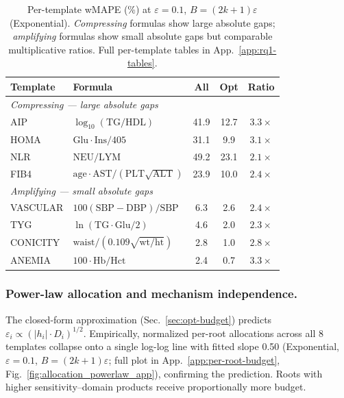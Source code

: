 \begin{table}[h]
\centering
\setlength{\tabcolsep}{4pt}
\small
\caption{Per-template wMAPE (\%) at $\varepsilon = 0.1$, $B = (2k{+}1)\varepsilon$ (Exponential). \emph{Compressing} formulas show large absolute gaps; \emph{amplifying} formulas show small absolute gaps but comparable multiplicative ratios. Full per-template tables in App.~\ref{app:rq1-tables}.}
\label{tab:per_template_summary}
\begin{tabular}{l l c c c}
\toprule
\textbf{Template} & \textbf{Formula} & \textbf{All} & \textbf{Opt} & \textbf{Ratio} \\
\midrule
\multicolumn{5}{l}{\emph{Compressing — large absolute gaps}} \\
AIP   & $\log_{10}(\text{TG}/\text{HDL})$           & 41.9 & 12.7 & $3.3\times$ \\
HOMA  & $\text{Glu}\cdot\text{Ins}/405$              & 31.1 &  9.9 & $3.1\times$ \\
NLR   & $\text{NEU}/\text{LYM}$                      & 49.2 & 23.1 & $2.1\times$ \\
FIB4  & $\text{age}\cdot\text{AST}/(\text{PLT}\sqrt{\text{ALT}})$ & 23.9 & 10.0 & $2.4\times$ \\
\midrule
\multicolumn{5}{l}{\emph{Amplifying — small absolute gaps}} \\
VASCULAR & $100(\text{SBP}{-}\text{DBP})/\text{SBP}$ &  6.3 &  2.6 & $2.4\times$ \\
TYG      & $\ln(\text{TG}\cdot\text{Glu}/2)$         &  4.6 &  2.0 & $2.3\times$ \\
CONICITY & $\text{waist}/(0.109\sqrt{\text{wt}/\text{ht}})$ &  2.8 &  1.0 & $2.8\times$ \\
ANEMIA   & $100\cdot\text{Hb}/\text{Hct}$            &  2.4 &  0.7 & $3.3\times$ \\
\bottomrule
\end{tabular}
\end{table}

\subsubsection{Power-law allocation and mechanism independence.}

The closed-form approximation (Sec.~\ref{sec:opt-budget}) predicts $\varepsilon_i \propto (|h_i| \cdot D_i)^{1/2}$. Empirically, normalized per-root allocations across all 8 templates collapse onto a single log-log line with fitted slope 0.50 (Exponential, $\varepsilon = 0.1$, $B = (2k{+}1)\varepsilon$; full plot in App.~\ref{app:per-root-budget}, Fig.~\ref{fig:allocation_powerlaw_app}), confirming the prediction. Roots with higher sensitivity--domain products receive proportionally more budget.

